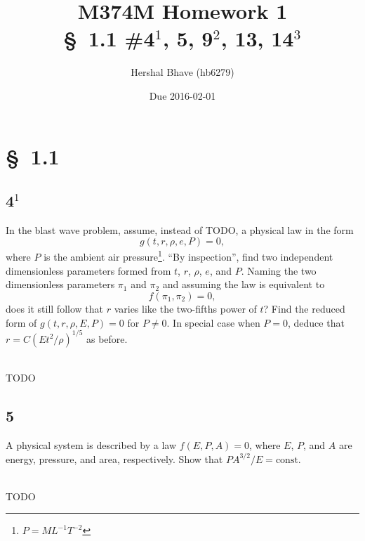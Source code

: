 \documentclass[12pt]{article}
\title{M374M Homework 1 \\
  \normalsize{\S~1.1 \#4$^1$, 5, 9$^2$, 13, 14$^3$}}
\author{Hershal Bhave (hb6279)}
\date{Due 2016-02-01}
\begin{document}
\maketitle

\section{\S~1.1}
\subsection{4$^1$}
\begin{Ex}
  In the blast wave problem, assume, instead of {\color{red}TODO}, a physical law
  in the form
  \begin{equation}
    g(t,r,\rho,e,P)=0,
  \end{equation}
  where $P$ is the ambient air pressure\footnote{$P=M L^{-1} T^{-2}$}. ``By
  inspection'', find two independent dimensionless parameters formed from $t$,
  $r$, $\rho$, $e$, and $P$. Naming the two dimensionless parameters $\pi_1$ and
  $\pi_2$ and assuming the law is equivalent to
  \begin{equation}
    f(\pi_1,\pi_2)=0,
  \end{equation}
  does it still follow that $r$ varies like the two-fifths power of $t$? Find
  the reduced form of $g(t,r,\rho,E,P)=0$ for $P\ne0$. In special case when
  $P=0$, deduce that $r=C(Et^2/\rho)^{1/5}$ as before.
  \begin{solution} \hfill \vspace{.75em} \\
    {\huge \color{red}TODO}
  \end{solution}
\end{Ex}

\subsection{5}
\begin{Ex}
  A physical system is described by a law $f(E,P,A)=0$, where $E$, $P$, and $A$
  are energy, pressure, and area, respectively. Show that $PA^{3/2}/E=\text{const}$.
  \begin{solution} \hfill \vspace{.75em} \\
    {\huge \color{red}TODO}
  \end{solution}
\end{Ex}
\end{document}
